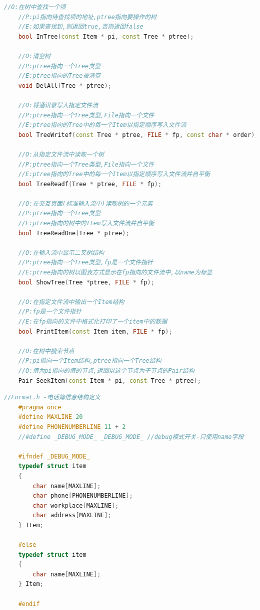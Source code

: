 \documentclass[12pt, a4paper, oneside]{ctexart}
\begin{document}
\begin{framed}
\begin{lstlisting}[language=C++]
    //O:在树中查找一个项
    //P:pi指向待查找项的地址,ptree指向要操作的树
    //E:如果查找到,则返回true,否则返回false
    bool InTree(const Item * pi, const Tree * ptree);
    
    //O:清空树
    //P:ptree指向一个Tree类型
    //E:ptree指向的Tree被清空
    void DelAll(Tree * ptree);
    
    //O:将通讯录写入指定文件流
    //P:ptree指向一个Tree类型,File指向一个文件
    //E:ptree指向的Tree中的每一个Item以指定顺序写入文件流
    bool TreeWritef(const Tree * ptree, FILE * fp, const char * order);
    
    //O:从指定文件流中读取一个树
    //P:ptree指向一个Tree类型,File指向一个文件
    //E:ptree指向的Tree中的每一个Item以指定顺序写入文件流并自平衡
    bool TreeReadf(Tree * ptree, FILE * fp);
    
    //O:在交互页面(标准输入流中)读取树的一个元素
    //P:ptree指向一个Tree类型
    //E:ptree指向的树中的Item写入文件流并自平衡
    bool TreeReadOne(Tree * ptree);
    
    //O:在输入流中显示二叉树结构
    //P:ptree指向一个Tree类型,fp是一个文件指针
    //E:ptree指向的树以图表方式显示在fp指向的文件流中,以name为标签
    bool ShowTree(Tree *ptree, FILE * fp);
    
    //O:在指定文件流中输出一个Item结构
    //P:fp是一个文件指针
    //E:在fp指向的文件中格式化打印了一个item中的数据
    bool PrintItem(const Item item, FILE * fp);
    
    //O:在树中搜索节点
    //P:pi指向一个Item结构,ptree指向一个Tree结构
    //O:值为pi指向的值的节点,返回以这个节点为子节点的Pair结构
    Pair SeekItem(const Item * pi, const Tree * ptree);
\end{lstlisting}
\end{framed}

\begin{framed}
\begin{lstlisting}[language=C++]
    //Format.h -电话簿信息结构定义
    #pragma once
    #define MAXLINE 20
    #define PHONENUMBERLINE 11 + 2
    //#define _DEBUG_MODE_ _DEBUG_MODE_ //debug模式开关-只使用name字段
    
    #ifndef _DEBUG_MODE_
    typedef struct item
    {
        char name[MAXLINE];
        char phone[PHONENUMBERLINE];
        char workplace[MAXLINE];
        char address[MAXLINE];
    } Item;
    
    #else
    typedef struct item
    {
        char name[MAXLINE];
    } Item;
    
    #endif
\end{lstlisting}
\end{framed}
\end{document}
